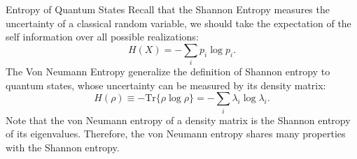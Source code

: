 \begin{subsection}{Entropy of Quantum States}
Recall that the Shannon Entropy measures the uncertainty of a classical random variable, we should take the expectation of the self information over all possible realizations:
\begin{equation*}
H(X) = -\sum_i p_i \log p_i.
\end{equation*}
The Von Neumann Entropy generalize the definition of Shannon entropy to quantum states, whose uncertainty can be measured by its density matrix:
\begin{equation*}
H(\rho) \equiv - \text{Tr} \{ \rho \log \rho \} = -\sum_{i} \lambda_i \log \lambda_i.
\end{equation*}
Note that the von Neumann entropy of a density matrix is the Shannon entropy of its eigenvalues. Therefore, the von Neumann entropy shares many properties with the Shannon entropy.
\end{subsection}


